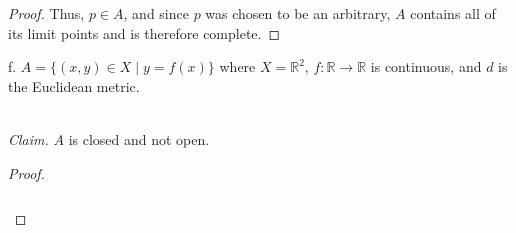\begin{proof}
    Thus, $p \in A$, and since $p$ was chosen to be an arbitrary, $A$ contains all of its limit points and is therefore
    complete.
\end{proof}

\pagebreak

f.  $A = \{ (x, y) \in X \mid y = f(x) \}$ where $X = \mathbb{R}^2$, $f:\mathbb{R} \to \mathbb{R}$ is continuous, and 
    $d$ is the Euclidean metric.

\ \\
\emph{Claim.} $A$ is closed and not open.

\begin{proof}\renewcommand{\qedsymbol}{}\ \\\\
    \begin{align*}
    \end{align*}
\end{proof}

\pagebreak